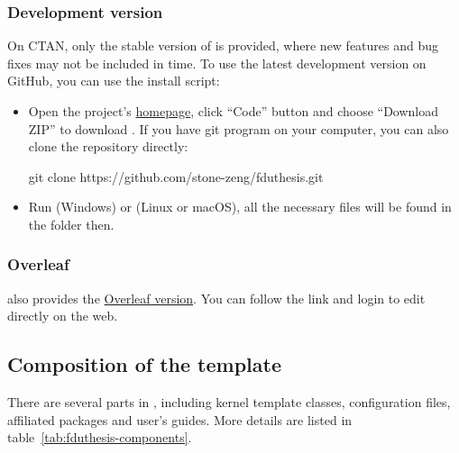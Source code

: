 \documentclass{fdudoc}
\begin{document}
\subsubsection{Development version}

On CTAN, only the stable version of  is provided, where new features and
bug fixes may not be included in time. To use the latest development version on GitHub,
you can use the install script:
\begin{itemize}
  \item Open the project's \href{https://github.com/stone-zeng/fduthesis}{homepage}, click
    ``Code'' button and choose ``Download ZIP'' to download .
    If you have git program on your computer, you can also clone the repository directly:
    \begin{shellexample}[gobble=5,alsoletter={.},morekeywords={git,clone}]
      git clone https://github.com/stone-zeng/fduthesis.git
    \end{shellexample}
  \item Run  (Windows) or  (Linux or macOS),
    all the necessary files will be found in the  folder then.
\end{itemize}

\subsubsection{Overleaf}

 also provides the \href{https://www.overleaf.com/latex/templates/fduthesis-latex-thesis-template-for-fudan-university/svtdhhstkmkt}{Overleaf version}.
You can follow the link and login to edit directly on the web.

\subsection{Composition of the template}

There are several parts in , including kernel template
classes, configuration files, affiliated packages and user's guides.
More details are listed in table~\ref{tab:fduthesis-components}.
\end{document}
